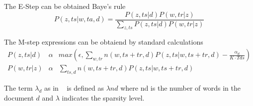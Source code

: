  The E-Step can be obtained Baye's rule
 \begin{equation}
 P(z,ts|w,ta,d) = \frac{P(z,ts|d)P(w,tr|z)}{\sum_{z,ts}P(z,ts|d)P(w,tr|z)}
 \end{equation}

The M-step expressions can be obtaiend by standard calculations
\begin{eqnarray}
P(z,ts|d) & \alpha & max(\epsilon, \sum_{w,tr}n(w,ts+tr,d)P(z,ts|w,ts+tr,d)- \frac{\alpha_{d}}{K\cdot Tds}) \\
P(w,tr|z) & \alpha & \sum_{ts,d}n(w,ts+tr,d)P(z,ts|w,ts+tr,d)
\end{eqnarray}

The term $\lambda_{d}$ as in ~\cite{Varadarajan_IJCV_2012,varadarajan_probabilistic_2010} is defined as $\lambda$$nd$ where nd is the number of words in the document $d$ and $\lambda$ indicates the sparsity level.